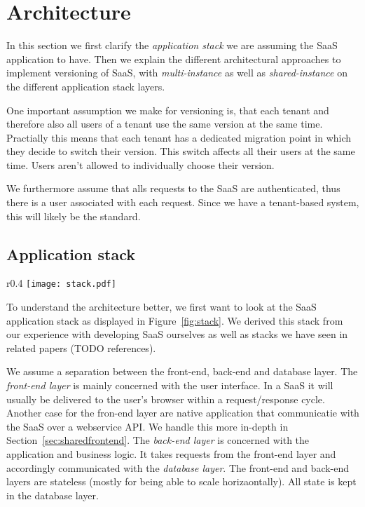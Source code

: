 \section{Architecture}
\label{sec:architecture}

In this section we first clarify the \emph{application stack} we are assuming the SaaS application to have. Then we explain the different architectural approaches to implement versioning of SaaS, with \emph{multi-instance} as well as \emph{shared-instance} on the different application stack layers.

One important assumption we make for versioning is, that each tenant and therefore also all users of a tenant use the same version at the same time. Practially this means that each tenant has a dedicated migration point in which they decide to switch their version. This switch affects all their users at the same time. Users aren't allowed to individually choose their version.

We furthermore assume that alls requests to the SaaS are authenticated, thus there is a user associated with each request. Since we have a tenant-based system, this will likely be the standard.

\subsection{Application stack}

\begin{wrapfigure}{r}{0.4\textwidth}
\centering
\texttt{[image: stack.pdf]}
\caption{Simplified Application Stack}
\label{fig:stack}
\end{wrapfigure}

To understand the architecture better, we first want to look at the SaaS application stack as displayed in Figure~\ref{fig:stack}. We derived this stack from our experience with developing SaaS ourselves as well as stacks we have seen in related papers (TODO references).

We assume a separation between the front-end, back-end and database layer. The \emph{front-end layer} is mainly concerned with the user interface. In a SaaS it will usually be delivered to the user's browser within a request/response cycle. Another case for the fron-end layer are native application that communicatie with the SaaS over a webservice API. We handle this more in-depth in Section~\ref{sec:sharedfrontend}. The \emph{back-end layer} is concerned with the application and business logic. It takes requests from the front-end layer and accordingly communicated with the \emph{database layer}. The front-end and back-end layers are stateless (mostly for being able to scale horizaontally). All state is kept in the database layer.

